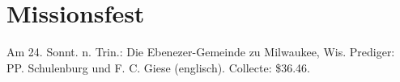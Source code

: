 \chapter{Missionsfest}

Am 24. Sonnt. n. Trin.: Die Ebenezer-Gemeinde zu Milwaukee, Wis. Prediger: PP. Schulenburg und F. C. Giese (englisch). Collecte: \$36.46.
